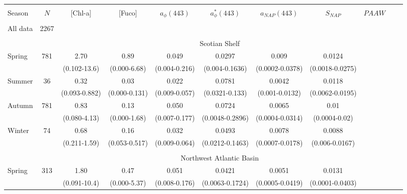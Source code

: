 \documentclass[utf8]{frontiersSCNS} %
\begin{document}
\begin{landscape}
\begin{center}
\begin{table}
\begin{tabular}{ l c c c c c c c c c c}
\hline
&  & & & & & &  & &\\
  Season & $N$ & [Chl-a] & [Fuco] & $a_\phi(443)$ & $a^*_\phi(443)$  &  $a_{NAP}(443)$ & $S_{NAP}$  & $PAAW$ \\
 \hline
 &  & & & & & &  & & & \\
 All data & 2267 & & & & & & & & \\ 
 & & & & & & & & \\
 & \multicolumn{10}{c}{\large Scotian Shelf} \\
\multirow{2}{*}{Spring} &   \multirow{2}{*}{781}    &   2.70    &   0.89    &   0.049   &   0.0297  &   0.009   &   0.0124  & \\
    &       &(0.102-13.6)   &   (0.000-6.68)    &   (0.004-0.216)   &   (0.004-0.1636)  &   (0.0002-0.0378) &   (0.0018-0.0275) & \\
\multirow{2}{*}{Summer} &   \multirow{2}{*}{36} &   0.32    &   0.03    &   0.022   &   0.0781  &   0.0042  &   0.0118  & \\
    &       &(0.093-0.882)  &   (0.000-0.131)   &   (0.009-0.057)   &   (0.0321-0.133)  &   (0.001-0.0132)  &   (0.0062-0.0195) & \\
\multirow{2}{*}{Autumn} &   \multirow{2}{*}{781} &  0.83    &   0.13    &   0.050   &   0.0724  &   0.0065  &   0.01    & \\
    &       &(0.080-4.13)   &   (0.000-1.68)    &   (0.007-0.177)   &   (0.0048-0.2896) &   (0.0004-0.0314) &   (0.0004-0.02)    & \\
\multirow{2}{*}{Winter} &   \multirow{2}{*}{74} &   0.68    &   0.16    &   0.032   &   0.0493  &   0.0078  &   0.0088  & \\
    &       &   (0.211-1.59)    &   (0.053-0.517)   &   (0.009-0.064)   &   (0.0212-0.1463) &   (0.0007-0.0178) &   (0.006-0.0167)  & \\
    &  & & & & & &  & && \\
 & \multicolumn{10}{c}{\large Northwest Atlantic Basin}  \\
\multirow{2}{*}{ Spring}    &\multirow{2}{*}{313}   &   1.80    &   0.47    &   0.051   &   0.0421  &   0.0051  &   0.0131  & \\    
    &       &   (0.091-10.4)    &   (0.000-5.37)    &   (0.008-0.176)   &   (0.0063-0.1724) &   (0.0005-0.0419) &   (0.0001-0.0403) & \\

\end{tabular}
\end{table}
\end{center}
\end{landscape}
\end{document}
